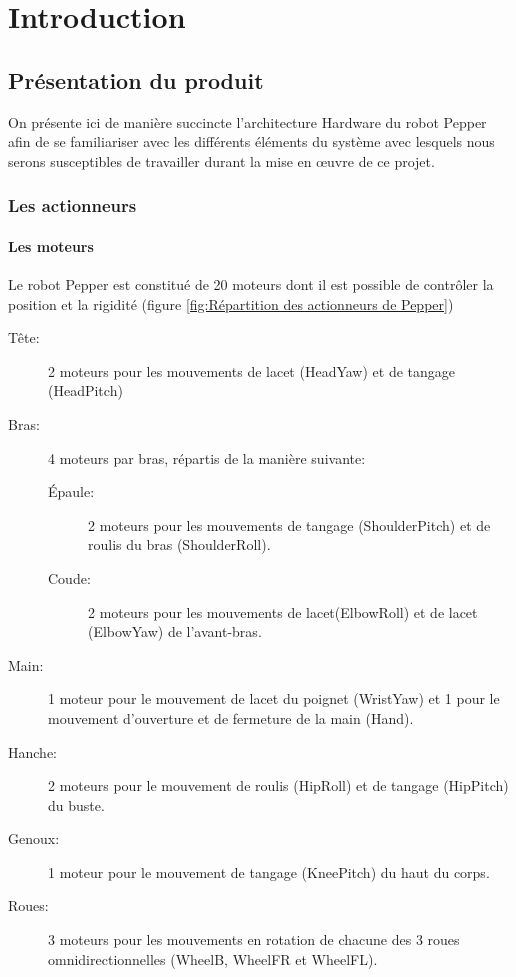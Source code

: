 \chapter{Introduction}
\label{Introduction}
\thispagestyle{fancy}

\section{Présentation du produit}
\label{Introduction:Présentation du produit}
On présente ici de manière succincte l'architecture Hardware du robot Pepper afin de se familiariser avec les différents éléments du système avec lesquels nous serons susceptibles de travailler durant la mise en œuvre de ce projet.  

\subsection{Les actionneurs}
\label{Introduction:Présentation du produit:Les actionneurs}
\subsubsection{Les moteurs}
\label{Introduction:Présentation du produit:Les actionneurs: Les moteurs}
Le robot Pepper est constitué de 20 moteurs dont il est possible de contrôler la position et la rigidité (figure \ref{fig:Répartition des actionneurs de Pepper})
\begin{description}
	\item [Tête:] 2 moteurs pour les mouvements de lacet (HeadYaw) et de tangage (HeadPitch)
	\item [Bras:] 4 moteurs par bras, répartis de la manière suivante: 
	\begin{description}
		\item [Épaule:] 2 moteurs pour les mouvements de tangage (ShoulderPitch) et de roulis du bras (ShoulderRoll).
		\item [Coude:] 2 moteurs pour les mouvements de lacet(ElbowRoll) et de lacet (ElbowYaw) de l'avant-bras.
	\end{description}
	\item [Main:] 1 moteur pour le mouvement de lacet du poignet (WristYaw) et 1 pour le mouvement d'ouverture et de fermeture de la main (Hand).
	\item [Hanche:] 2 moteurs pour le mouvement de roulis (HipRoll) et de tangage (HipPitch) du buste.
	\item [Genoux:] 1 moteur pour le mouvement de tangage (KneePitch) du haut du corps.
	\item [Roues:] 3 moteurs pour les mouvements en rotation de chacune des 3 roues omnidirectionnelles (WheelB, WheelFR et WheelFL).
\end{description}


